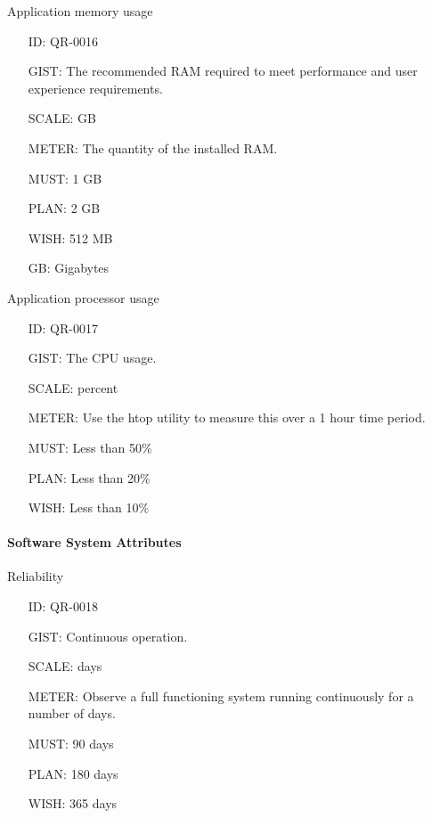         Application memory usage

        \begin{itemize}
          \setlength{\itemindent}{.5in}
          \itemsep .15em
          \item[ID:] QR-0016
          \item[GIST:] The recommended RAM required to meet performance and user
            experience requirements.
          \item[SCALE:] GB
          \item[METER:] The quantity of the installed RAM.
          \item[MUST:] 1 GB
          \item[PLAN:] 2 GB
          \item[WISH:] 512 MB
          \item[GB:] Gigabytes
        \end{itemize}

        \newpage

        Application processor usage

        \begin{itemize}
          \setlength{\itemindent}{.5in}
          \itemsep .15em
          \item[ID:] QR-0017
          \item[GIST:] The CPU usage.
          \item[SCALE:] percent
          \item[METER:] Use the htop utility to measure this over a 1 hour time
            period.
          \item[MUST:] Less than 50\%
          \item[PLAN:] Less than 20\%
          \item[WISH:] Less than 10\%
        \end{itemize}

      \paragraph{Software System Attributes}

        Reliability

        \begin{itemize}
          \setlength{\itemindent}{.5in}
          \itemsep .15em
          \item[ID:] QR-0018
          \item[GIST:] Continuous operation.
          \item[SCALE:] days
          \item[METER:] Observe a full functioning system running continuously
            for a number of days.
          \item[MUST:] 90 days
          \item[PLAN:] 180 days
          \item[WISH:] 365 days
        \end{itemize}

